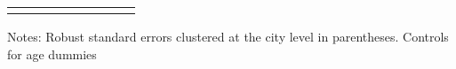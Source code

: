 \begin{table}[H]
{\begin{threeparttable}
\begin{tabular}{lcccccccc}
\bottomrule[0.5pt]                                                                               \label{tab:table2}                                                                       \end{tabular}                                                                                                    \vspace{-13pt}                                                                                           \begin{tablenotes}[flushleft]{\setlength{\itemindent}{-3pt}}          \small                                                                                                           \item Notes: Robust standard errors clustered at the city level  in  parentheses. Controls for age dummies           \end{tablenotes}                                                                                         \end{threeparttable}                                                                             }                                                                                                                        \end{table}
